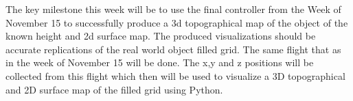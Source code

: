 The key milestone this week will be to use the final controller from the Week of November 15 to successfully produce a 3d topographical map of the object of the known height and 2d surface map. The produced visualizations should be accurate replications of the real world object filled grid. The same flight that as in the week of November 15 will be done. The x,y and z positions will be collected from this flight which then will be used to visualize a 3D topographical and 2D surface map of the filled grid using Python.